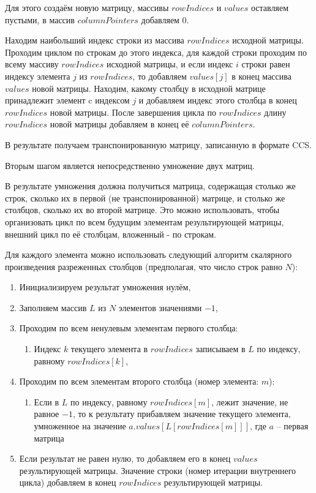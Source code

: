 \documentclass[a4paper,12pt]{article}
\begin{document}
Для этого создаём новую матрицу, массивы $rowIndices$ и $values$ оставляем пустыми, в массив $columnPointers$ добавляем 0.

Находим наибольший индекс строки из массива $rowIndices$ исходной матрицы.
Проходим циклом по строкам до этого индекса, для каждой строки проходим по всему массиву $rowIndices$ исходной матрицы, и если индекс $i$ строки равен индексу элемента $j$ из $rowIndices$, то добавляем $values[j]$ в конец массива $values$ новой матрицы. Находим, какому столбцу в исходной матрице принадлежит элемент c индексом $j$ и добавляем индекс этого столбца в конец $rowIndices$ новой матрицы. После завершения цикла по $rowIndices$ длину $rowIndices$ новой матрицы добавляем в конец её $columnPointers$.

В результате получаем транспонированную матрицу, записанную в формате CCS.

Вторым шагом является непосредственно умножение двух матриц.

В результате умножения должна получиться матрица, содержащая столько же строк, сколько их в первой (не транспонированной) матрице, и столько же столбцов, сколько их во второй матрице. Это можно использовать, чтобы организовать цикл по всем будущим элементам результирующей матрицы, внешний цикл по её столбцам, вложенный - по строкам.

Для каждого элемента можно использовать следующий алгоритм скалярного произведения разреженных столбцов (предполагая, что число строк равно $N$):
\begin{enumerate}[label*=\arabic*.]
 \item Инициализируем результат умножения нулём,
 \item Заполняем массив $L$ из $N$ элементов значениями $-1$,
 \item Проходим по всем ненулевым элементам первого столбца:
 \begin{enumerate}[label*=\arabic*.]
    \item Индекс $k$ текущего элемента в $rowIndices$ записываем в $L$ по индексу, равному $rowIndices[k]$,
\end{enumerate}
\item Проходим по всем элементам второго столбца (номер элемента: $m$):
\begin{enumerate}[label*=\arabic*.]
 \item Если в $L$ по индексу, равному $rowIndices[m]$, лежит значение, не равное $-1$, то
 к результату прибавляем значение текущего элемента, умноженное на значение $a.values[L[rowIndices[m]]]$, где $a$ -- первая матрица
\end{enumerate}
\item Если результат не равен нулю, то добавляем его в конец $values$ результирующей матрицы.
Значение строки (номер итерации внутреннего цикла) добавляем в конец $rowIndices$ результирующей матрицы.
\end{enumerate}
\end{document}
